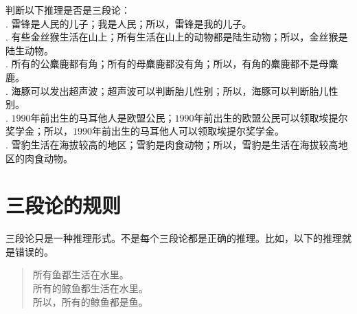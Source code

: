 \documentclass[12pt,UTF8]{ctexbook}
\begin{document}
\begin{xt}\label{xt:4-0-10}
    判断以下推理是否是三段论：\\
    . 雷锋是人民的儿子；我是人民；所以，雷锋是我的儿子。\\
    . 有些金丝猴生活在山上；所有生活在山上的动物都是陆生动物；所以，金丝猴是陆生动物。\\
    . 所有的公麋鹿都有角；所有的母麋鹿都没有角；所以，有角的麋鹿都不是母麋鹿。\\
    . 海豚可以发出超声波；超声波可以判断胎儿性别；所以，海豚可以判断胎儿性别。\\
    . $1990$年前出生的马耳他人是欧盟公民；$1990$年前出生的欧盟公民可以领取埃提尔奖学金；所以，$1990$年前出生的马耳他人可以领取埃提尔奖学金。\\
    . 雪豹生活在海拔较高的地区；雪豹是肉食动物；所以，雪豹是生活在海拔较高地区的肉食动物。
\end{xt}
\section{三段论的规则}
三段论只是一种推理形式。不是每个三段论都是正确的推理。比如，以下的推理就是错误的。
\begin{quotation}
    \noindent 所有鱼都生活在水里。\\    
    所有的鲸鱼都生活在水里。\\    
    所以，所有的鲸鱼都是鱼。
\end{quotation}
\end{document}
